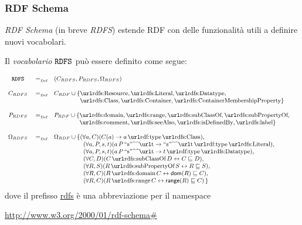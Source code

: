 \documentclass[8pt]{beamer}
\begin{document}
\begin{frame}
 \frametitle{RDF Schema}
 \emph{RDF Schema} (in breve \emph{RDFS}) estende RDF con 
 delle funzionalit\`a utili a definire nuovi vocabolari.
  \vspace{\baselineskip}

Il \emph{vocabolario $\mathtt{RDFS}$} pu\`o essere definito come segue:
 
\[
 \begin{small}
 \begin{array}{cclc}
 \RDFSv & \defAs & (C_{RDFS}, P_{RDFS}, \Omega_{RDFS}) \\
 &&\\
 C_{RDFS} & \defAs & C_{RDF} \cup \{ \mathurl{rdfs:Resource}, \mathurl{rdfs:Literal}, \mathurl{rdfs:Datatype}, \\
 &&\phantom{C_{RDF} \cup \{}\mathurl{rdfs:Class}, \mathurl{rdfs:Container}, \mathurl{rdfs:ContainerMembershipProperty} \}\\
 &&\\
 P_{RDFS} & \defAs & P_{RDF} \cup \{\mathurl{rdfs:domain}, \mathurl{rdfs:range}, \mathurl{rdfs:subClassOf}, \mathurl{rdfs:subPropertyOf},\\
 &&\phantom{P_{RDF} \cup \{} \mathurl{rdfs:comment}, \mathurl{rdfs:seeAlso}, \mathurl{rdfs:isDefinedBy}, \mathurl{rdfs:label} \}\\
 \\
 \Omega_{RDFS} & \defAs & \Omega_{RDF} \cup \{ (\forall a, C)(C(a) \rightarrow a\,\mathurl{rdf:type}\,\mathurl{rdfs:Class}), & \\ 
 &&\phantom{\Omega_{RDFS} \cup \{}(\forall a,P,s,t)(a\,P\,\literal{s}{t} \rightarrow \literal{s}{t}\,\mathurl{rdf:type}\,\mathurl{rdfs:Literal}), & \\
 &&\phantom{\Omega_{RDFS} \cup \{}(\forall a,P,s,t)(a\,P\,\literal{s}{t} \rightarrow t\,\mathurl{rdf:type}\,\mathurl{rdfs:Datatype}), & \\
 &&\phantom{\Omega_{RDFS} \cup \{}(\forall C,D)(C\,\mathurl{rdfs:subClassOf}\,D  \leftrightarrow C \Issub D), & \\
 &&\phantom{\Omega_{RDFS} \cup \{}(\forall R,S)(R\,\mathurl{rdfs:subPropertyOf}\,S  \leftrightarrow R \Issub S), & \\
 &&\phantom{\Omega_{RDFS} \cup \{}(\forall R,C)(R\,\mathurl{rdfs:domain}\,C  \leftrightarrow \dom(R) \Issub C), & \\
 &&\phantom{\Omega_{RDFS} \cup \{}(\forall R,C)(R\,\mathurl{rdfs:range}\,C  \leftrightarrow \range(R) \Issub C)\,\} \\
 \end{array}
 \end{small}
\]
dove il prefisso \url{rdfs} \`e una abbreviazione per il namespace
\begin{center}
 \url{http://www.w3.org/2000/01/rdf-schema\#}
\end{center}
\end{frame}
\end{document}
